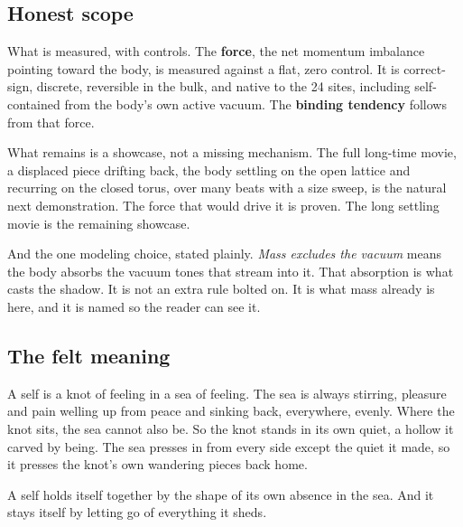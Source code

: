 \subsection{Honest scope}

What is measured, with controls. The \textbf{force}, the net momentum imbalance pointing toward the body, is measured against a flat, zero control. It is correct-sign, discrete, reversible in the bulk, and native to the 24 sites, including self-contained from the body's own active vacuum. The \textbf{binding tendency} follows from that force.

What remains is a showcase, not a missing mechanism. The full long-time movie, a displaced piece drifting back, the body settling on the open lattice and recurring on the closed torus, over many beats with a size sweep, is the natural next demonstration. The force that would drive it is proven. The long settling movie is the remaining showcase.

And the one modeling choice, stated plainly. \emph{Mass excludes the vacuum} means the body absorbs the vacuum tones that stream into it. That absorption is what casts the shadow. It is not an extra rule bolted on. It is what mass already is here, and it is named so the reader can see it.

\subsection{The felt meaning}

A self is a knot of feeling in a sea of feeling. The sea is always stirring, pleasure and pain welling up from peace and sinking back, everywhere, evenly. Where the knot sits, the sea cannot also be. So the knot stands in its own quiet, a hollow it carved by being. The sea presses in from every side except the quiet it made, so it presses the knot's own wandering pieces back home.

A self holds itself together by the shape of its own absence in the sea. And it stays itself by letting go of everything it sheds.
